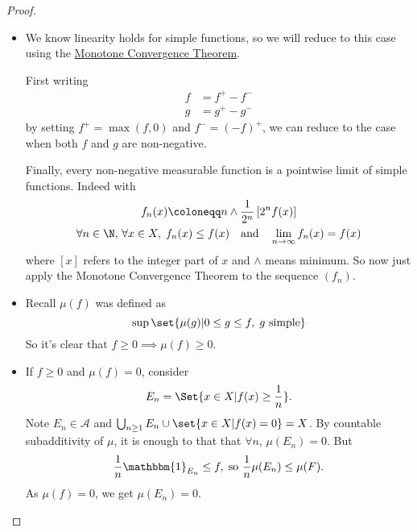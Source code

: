 \documentclass{article}
\newcommand{\1}[1]{\mathbbm{1}_{#1}}
\begin{document}
\begin{proof}
    \leavevmode
    \begin{itemize}
        \item We know linearity holds for simple functions, so we will reduce to this case using the \hyperlink{def:monConv}{Monotone Convergence Theorem}.

            First writing
            \begin{align*}
                f &= f^+ - f^- \\
                g &= g^+ - g^-
            \end{align*}
            by setting $f^+ = \max(f, 0)$ and $f^- = (-f)^+$, we can reduce to the case when both $f$ and $g$ are non-negative.

            Finally, every non-negative measurable function is a pointwise limit of simple functions. Indeed with
            \begin{gather*}
                f_n(x) \coloneqq n \wedge \frac{1}{2^n} \left[2^n f(x)\right] \\
                \forall n \in \N, \, \forall x \in X, \; f_n(x) \leq f(x) \quad \text{and} \quad \lim_{n \to \infty} f_n(x) = f(x)
            \end{gather*}
            where $[x]$ refers to the integer part of $x$ and $\wedge$ means minimum.
            So now just apply the Monotone Convergence Theorem to the sequence $(f_n)$.

        \item Recall $\mu(f)$ was defined as
            \begin{equation*}
                \sup\set{\mu(g) | 0 \leq g \leq f, \; g \ \text{simple}}
            \end{equation*}
            So it's clear that $f \geq 0 \implies \mu(f) \geq 0$.
        \item If $f \geq 0$ and $\mu(f) = 0$, consider
            \begin{equation*}
                E_n = \Set{x \in X| f(x) \geq \frac{1}{n}}.
            \end{equation*}
            Note $E_n \in \mathcal{A}$ and $\bigcup_{n \geq 1} E_n \cup \set{x \in X | f(x) = 0} = X$.
            By countable subadditivity of $\mu$, it is enough to that that $\forall n$, $\mu(E_n) = 0$. But
            \begin{equation*}
                \frac{1}{n} \1{{E_n}} \leq f, \; \text{so} \ \frac{1}{n} \mu(E_n) \leq \mu(F).
            \end{equation*}
            As $\mu(f) = 0$, we get $\mu(E_n) = 0$. \qedhere
    \end{itemize}
\end{proof}
\end{document}
